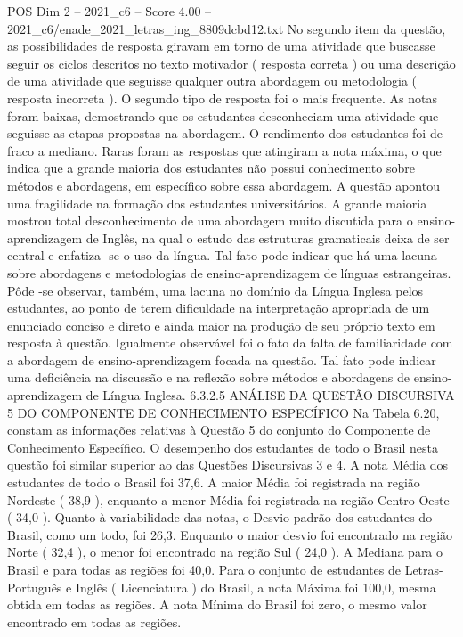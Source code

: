 \begin{textsample}{POS Dim 2 – 2021\_c6 – Score 4.00 – 2021\_c6/enade\_2021\_letras\_ing\_8809dcbd12.txt}
No segundo item da questão, as possibilidades de resposta giravam em torno de uma atividade que buscasse seguir os ciclos descritos no texto motivador ( resposta correta ) ou uma descrição de uma atividade que seguisse qualquer outra abordagem ou metodologia ( resposta incorreta ).
O segundo tipo de resposta foi o mais frequente.
As notas foram baixas, demostrando que os estudantes desconheciam uma atividade que seguisse as etapas propostas na abordagem.
O rendimento dos estudantes foi de fraco a mediano.
Raras foram as respostas que atingiram a nota máxima, o que indica que a grande maioria dos estudantes não possui conhecimento sobre métodos e abordagens, em específico sobre essa abordagem.
A questão apontou uma fragilidade na formação dos estudantes universitários.
A grande maioria mostrou total desconhecimento de uma abordagem muito discutida para o ensino-aprendizagem de Inglês, na qual o estudo das estruturas gramaticais deixa de ser central e enfatiza -se o uso da língua.
Tal fato pode indicar que há uma lacuna sobre abordagens e metodologias de ensino-aprendizagem de línguas estrangeiras.
Pôde -se observar, também, uma lacuna no domínio da Língua Inglesa pelos estudantes, ao ponto de terem dificuldade na interpretação apropriada de um enunciado conciso e direto e ainda maior na produção de seu próprio texto em resposta à questão.
Igualmente observável foi o fato da falta de familiaridade com a abordagem de ensino-aprendizagem focada na questão.
Tal fato pode indicar uma deficiência na discussão e na reflexão sobre métodos e abordagens de ensino-aprendizagem de Língua Inglesa. 6.3.2.5 ANÁLISE DA QUESTÃO DISCURSIVA 5 DO COMPONENTE DE CONHECIMENTO ESPECÍFICO Na Tabela 6.20, constam as informações relativas à Questão 5 do conjunto do Componente de Conhecimento Específico.
O desempenho dos estudantes de todo o Brasil nesta questão foi similar superior ao das Questões Discursivas 3 e 4.
A nota Média dos estudantes de todo o Brasil foi 37,6.
A maior Média foi registrada na região Nordeste ( 38,9 ), enquanto a menor Média foi registrada na região Centro-Oeste ( 34,0 ).
Quanto à variabilidade das notas, o Desvio padrão dos estudantes do Brasil, como um todo, foi 26,3.
Enquanto o maior desvio foi encontrado na região Norte ( 32,4 ), o menor foi encontrado na região Sul ( 24,0 ).
A Mediana para o Brasil e para todas as regiões foi 40,0.
Para o conjunto de estudantes de Letras-Português e Inglês ( Licenciatura ) do Brasil, a nota Máxima foi 100,0, mesma obtida em todas as regiões.
A nota Mínima do Brasil foi zero, o mesmo valor encontrado em todas as regiões.

\end{textsample}
